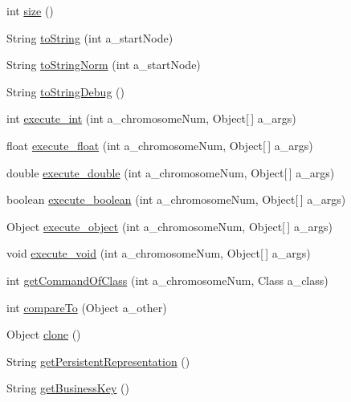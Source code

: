 \begin{DoxyCompactItemize}
\item 
int \hyperlink{classorg_1_1jgap_1_1gp_1_1impl_1_1_g_p_program_ac094b8270841a331237afff26c1fd3c8}{size} ()
\item 
String \hyperlink{classorg_1_1jgap_1_1gp_1_1impl_1_1_g_p_program_a220b6c2ed5af6eb266f396b704c8d873}{to\-String} (int a\-\_\-start\-Node)
\item 
String \hyperlink{classorg_1_1jgap_1_1gp_1_1impl_1_1_g_p_program_a88fcd847e2fe1955ea9607b2c0b2d814}{to\-String\-Norm} (int a\-\_\-start\-Node)
\item 
String \hyperlink{classorg_1_1jgap_1_1gp_1_1impl_1_1_g_p_program_aa6a1ee6e89576971f68107e092c92dff}{to\-String\-Debug} ()
\item 
int \hyperlink{classorg_1_1jgap_1_1gp_1_1impl_1_1_g_p_program_a54c512d511d99087100cc0f3cb26f0e0}{execute\-\_\-int} (int a\-\_\-chromosome\-Num, Object\mbox{[}$\,$\mbox{]} a\-\_\-args)
\item 
float \hyperlink{classorg_1_1jgap_1_1gp_1_1impl_1_1_g_p_program_aeca7a5b7573313cbc44f9d0fd9263382}{execute\-\_\-float} (int a\-\_\-chromosome\-Num, Object\mbox{[}$\,$\mbox{]} a\-\_\-args)
\item 
double \hyperlink{classorg_1_1jgap_1_1gp_1_1impl_1_1_g_p_program_acc63a7011940878149f3f31e1f4bd6a9}{execute\-\_\-double} (int a\-\_\-chromosome\-Num, Object\mbox{[}$\,$\mbox{]} a\-\_\-args)
\item 
boolean \hyperlink{classorg_1_1jgap_1_1gp_1_1impl_1_1_g_p_program_af54a9afea07bf9faefe487d125039016}{execute\-\_\-boolean} (int a\-\_\-chromosome\-Num, Object\mbox{[}$\,$\mbox{]} a\-\_\-args)
\item 
Object \hyperlink{classorg_1_1jgap_1_1gp_1_1impl_1_1_g_p_program_acf96d41d757a05896eac7377607dae67}{execute\-\_\-object} (int a\-\_\-chromosome\-Num, Object\mbox{[}$\,$\mbox{]} a\-\_\-args)
\item 
void \hyperlink{classorg_1_1jgap_1_1gp_1_1impl_1_1_g_p_program_ad790a2a9693298dc2dcdc5c8098bbf72}{execute\-\_\-void} (int a\-\_\-chromosome\-Num, Object\mbox{[}$\,$\mbox{]} a\-\_\-args)
\item 
int \hyperlink{classorg_1_1jgap_1_1gp_1_1impl_1_1_g_p_program_ac9aaed0206c092f51a05cc2fb600cf63}{get\-Command\-Of\-Class} (int a\-\_\-chromosome\-Num, Class a\-\_\-class)
\item 
int \hyperlink{classorg_1_1jgap_1_1gp_1_1impl_1_1_g_p_program_a34ad90a59a6378e320188aed293d26ea}{compare\-To} (Object a\-\_\-other)
\item 
Object \hyperlink{classorg_1_1jgap_1_1gp_1_1impl_1_1_g_p_program_a95db8f334287b1434fbd8d12d1c1be99}{clone} ()
\item 
String \hyperlink{classorg_1_1jgap_1_1gp_1_1impl_1_1_g_p_program_afb4433bf414be6c31533f57a89a54c34}{get\-Persistent\-Representation} ()
\item 
String \hyperlink{classorg_1_1jgap_1_1gp_1_1impl_1_1_g_p_program_aef41b8fda92d9d1b3607ed7d16243468}{get\-Business\-Key} ()
\end{DoxyCompactItemize}
